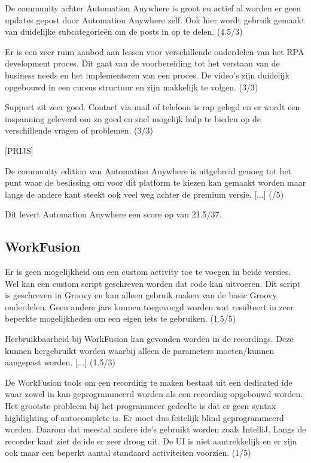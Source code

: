 De community achter Automation Anywhere is groot en actief al worden er geen updates gepost door Automation Anywhere zelf. Ook hier wordt gebruik gemaakt van duidelijke subcategorieën om de posts in op te delen. (4.5/3) 

Er is een zeer ruim aanbod aan lessen voor verschillende onderdelen van het RPA development proces. Dit gaat van de voorbereiding tot het verstaan van de business needs en het implementeren van een proces. De video's zijn duidelijk opgebouwd in een cursus structuur en zijn makkelijk te volgen. (3/3)

Support zit zeer goed. Contact via mail of telefoon is rap gelegd en er wordt een inspanning geleverd om zo goed en snel mogelijk hulp te bieden op de verschillende vragen of problemen. (3/3)

[PRIJS]

De community edition van Automation Anywhere is uitgebreid genoeg tot het punt waar de beslissing om voor dit platform te kiezen kan gemaakt worden maar langs de andere kant steekt ook veel weg achter de premium versie. [...] (/5)

Dit levert Automation Anywhere een score op van 21.5/37.

\subsection{WorkFusion}

Er is geen mogelijkheid om een custom activity toe te voegen in beide versies. Wel kan een custom script geschreven worden dat code kan uitvoeren. Dit script is geschreven in Groovy en kan alleen gebruik maken van de basic Groovy onderdelen. Geen andere jars kunnen toegevoegd worden wat resulteert in zeer beperkte mogelijkheden om een eigen iets te gebruiken. (1.5/5)

Herbruikbaarheid bij WorkFusion kan gevonden worden in de recordings. Deze kunnen hergebruikt worden waarbij alleen de parameters moeten/kunnen aangepast worden. [...] (1.5/3)

De WorkFusion tools om een recording te maken bestaat uit een dedicated ide waar zowel in kan geprogrammeerd worden als een recording opgebouwd worden. Het grootste probleem bij het programmeer gedeelte is dat er geen syntax highlighting of autocomplete is. Er moet dus feitelijk blind geprogrammeerd worden. Daarom dat meestal andere ide's gebruikt worden zoals IntelliJ. Langs de recorder kant ziet de ide er zeer droog uit. De UI is niet aantrekkelijk en er zijn ook maar een beperkt aantal standaard activiteiten voorzien. (1/5)

